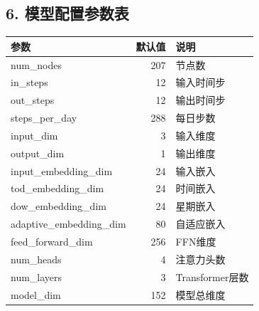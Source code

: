 \documentclass[12pt,a4paper]{article}
\begin{document}
\vspace{1cm}

\subsection*{6. 模型配置参数表}

\begin{table}[H]
	\centering
	\begin{tabular}{|l|r|l|}
		\hline
		参数                       & 默认值 & 说明            \\
		\hline
		num\_nodes               & 207 & 节点数           \\
		in\_steps                & 12  & 输入时间步         \\
		out\_steps               & 12  & 输出时间步         \\
		steps\_per\_day          & 288 & 每日步数          \\
		input\_dim               & 3   & 输入维度          \\
		output\_dim              & 1   & 输出维度          \\
		input\_embedding\_dim    & 24  & 输入嵌入          \\
		tod\_embedding\_dim      & 24  & 时间嵌入          \\
		dow\_embedding\_dim      & 24  & 星期嵌入          \\
		adaptive\_embedding\_dim & 80  & 自适应嵌入         \\
		feed\_forward\_dim       & 256 & FFN维度         \\
		num\_heads               & 4   & 注意力头数         \\
		num\_layers              & 3   & Transformer层数 \\
		model\_dim               & 152 & 模型总维度         \\
		\hline
	\end{tabular}
\end{table}
\end{document}
